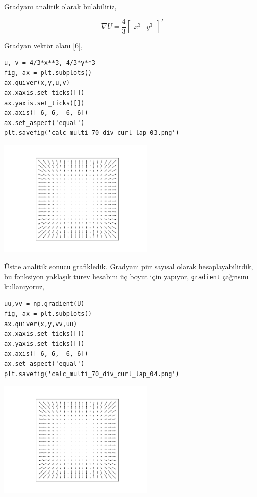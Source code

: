 \documentclass[12pt,fleqn]{article}\usepackage{../../common}
\begin{document}
Gradyanı analitik olarak bulabiliriz,

$$
\nabla U = \frac{4}{3} [\begin{array}{cc} x^3 & y^3 \end{array}]^T
$$

Gradyan vektör alanı [6],

\begin{verbatim}
u, v = 4/3*x**3, 4/3*y**3
fig, ax = plt.subplots()
ax.quiver(x,y,u,v)
ax.xaxis.set_ticks([])
ax.yaxis.set_ticks([])
ax.axis([-6, 6, -6, 6])
ax.set_aspect('equal')
plt.savefig('calc_multi_70_div_curl_lap_03.png')
\end{verbatim}

\includegraphics[width=20em]{calc_multi_70_div_curl_lap_03.png}

Üstte analitik sonucu grafikledik. Gradyanı pür sayısal olarak
hesaplayabilirdik, bu fonksiyon yaklaşık türev hesabını üç boyut için yapıyor,
\verb!gradient! çağrısını kullanıyoruz, 

\begin{verbatim}
uu,vv = np.gradient(U)
fig, ax = plt.subplots()
ax.quiver(x,y,vv,uu)
ax.xaxis.set_ticks([])
ax.yaxis.set_ticks([])
ax.axis([-6, 6, -6, 6])
ax.set_aspect('equal')
plt.savefig('calc_multi_70_div_curl_lap_04.png')
\end{verbatim}

\includegraphics[width=20em]{calc_multi_70_div_curl_lap_04.png}
\end{document}
